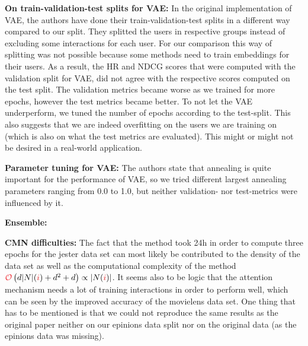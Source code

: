 \textbf{On train-validation-test splits for VAE:} 
In the original implementation of VAE, the authors have done their train-validation-test splits in a different way compared to our split.
They splitted the users in respective groups instead of excluding some interactions for each user. 
For our comparison this way of splitting was not possible because some methods need to train embeddings for their users. 
As a result, the HR and NDCG scores that were computed with the validation split for VAE, did not agree with the respective scores computed on the test split. 
The validation metrics became worse as we trained for more epochs, however the test metrics became better. 
To not let the VAE underperform, we tuned the number of epochs according to the test-split. 
This also suggests that we are indeed overfitting on the users we are training on (which is also on what the test metrics are evaluated). 
This might or might not be desired in a real-world application.

\textbf{Parameter tuning for VAE:} 
The authors state that annealing is quite important for the performance of VAE, so we tried different largest annealing parameters ranging from 0.0 to 1.0, but neither validation- nor test-metrics were influenced by it.

\textbf{Ensemble:} 

\textbf{CMN difficulties:}
The fact that the method took 24h in order to compute three epochs for the jester data set can most likely be contributed to the density of the data set as well as the computational complexity of the method $\bigO\left(d\abs{N}(\idxi)+d^2+d\right)\propto\abs{N(\idxi)}$.
It seems also to be logic that the attention mechanism needs a lot of training interactions in order to perform well, which can be seen by the improved accuracy of the movielens data set.
One thing that has to be mentioned is that we could not reproduce the same results as the original paper neither on our epinions data split nor on the original data (as the epinions data was missing).
